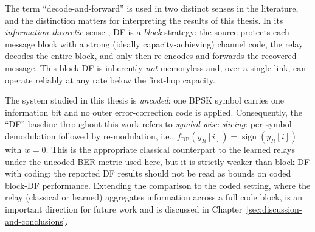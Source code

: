 \begin{remark}\label{rem:df-terminology}
The term ``decode-and-forward'' is used in two distinct senses in the literature, and the distinction matters for interpreting the results of this thesis. In its \emph{information-theoretic} sense \cite{CoverGamal1979RelayChannel,ElGamalKim2011NetworkIT}, DF is a \emph{block} strategy: the source protects each message block with a strong (ideally capacity-achieving) channel code, the relay decodes the entire block, and only then re-encodes and forwards the recovered message. This block-DF is inherently \emph{not} memoryless and, over a single link, can operate reliably at any rate below the first-hop capacity.

The system studied in this thesis is \emph{uncoded}: one BPSK symbol carries one information bit and no outer error-correction code is applied. Consequently, the ``DF'' baseline throughout this work refers to \emph{symbol-wise slicing}: per-symbol demodulation followed by re-modulation, i.e., $f_{\text{DF}}(y_R[i]) = \operatorname{sign}(y_R[i])$ with $w=0$. This is the appropriate classical counterpart to the learned relays under the uncoded BER metric used here, but it is strictly weaker than block-DF with coding; the reported DF results should not be read as bounds on coded block-DF performance. Extending the comparison to the coded setting, where the relay (classical or learned) aggregates information across a full code block, is an important direction for future work and is discussed in Chapter~\ref{sec:discussion-and-conclusions}.
\end{remark}
